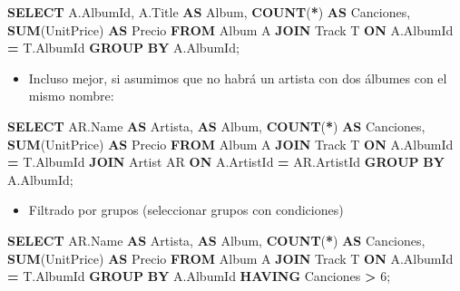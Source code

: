 \documentclass[
]{book}
\newenvironment{Shaded}{\begin{snugshade}}{\end{snugshade}}
\newcommand{\DecValTok}[1]{\textcolor[rgb]{0.00,0.00,0.81}{#1}}
\newcommand{\FunctionTok}[1]{\textcolor[rgb]{0.13,0.29,0.53}{\textbf{#1}}}
\newcommand{\KeywordTok}[1]{\textcolor[rgb]{0.13,0.29,0.53}{\textbf{#1}}}
\newcommand{\NormalTok}[1]{#1}
\newcommand{\OperatorTok}[1]{\textcolor[rgb]{0.81,0.36,0.00}{\textbf{#1}}}
\providecommand{\tightlist}{%
  \setlength{\itemsep}{0pt}\setlength{\parskip}{0pt}}
\theoremstyle{break}
\theoremstyle{nonumberplain}
\begin{document}
\begin{Shaded}
\begin{Highlighting}[]
  \KeywordTok{SELECT}\NormalTok{ A.AlbumId, A.Title }\KeywordTok{AS}\NormalTok{ Album, }\FunctionTok{COUNT}\NormalTok{(}\OperatorTok{*}\NormalTok{) }\KeywordTok{AS}\NormalTok{ Canciones, }\FunctionTok{SUM}\NormalTok{(UnitPrice) }\KeywordTok{AS}\NormalTok{ Precio }
  \KeywordTok{FROM}\NormalTok{ Album A }\KeywordTok{JOIN}\NormalTok{ Track T }\KeywordTok{ON}\NormalTok{ A.AlbumId }\OperatorTok{=}\NormalTok{ T.AlbumId }
  \KeywordTok{GROUP} \KeywordTok{BY}\NormalTok{ A.AlbumId;}
\end{Highlighting}
\end{Shaded}

\begin{itemize}
\tightlist
\item
  Incluso mejor, si asumimos que no habrá un artista con dos álbumes con el mismo nombre:
\end{itemize}

\begin{Shaded}
\begin{Highlighting}[]
  \KeywordTok{SELECT}\NormalTok{ AR.Name }\KeywordTok{AS}\NormalTok{ Artista, }\KeywordTok{AS}\NormalTok{ Album, }\FunctionTok{COUNT}\NormalTok{(}\OperatorTok{*}\NormalTok{) }\KeywordTok{AS}\NormalTok{ Canciones, }\FunctionTok{SUM}\NormalTok{(UnitPrice) }\KeywordTok{AS}\NormalTok{ Precio }
  \KeywordTok{FROM}\NormalTok{ Album A }\KeywordTok{JOIN}\NormalTok{ Track T }\KeywordTok{ON}\NormalTok{ A.AlbumId }\OperatorTok{=}\NormalTok{ T.AlbumId}
               \KeywordTok{JOIN}\NormalTok{ Artist AR }\KeywordTok{ON}\NormalTok{ A.ArtistId }\OperatorTok{=}\NormalTok{ AR.ArtistId }
  \KeywordTok{GROUP} \KeywordTok{BY}\NormalTok{ A.AlbumId;}
\end{Highlighting}
\end{Shaded}

\begin{itemize}
\tightlist
\item
  Filtrado por grupos (seleccionar grupos con condiciones)
\end{itemize}

\begin{Shaded}
\begin{Highlighting}[]
  \KeywordTok{SELECT}\NormalTok{ AR.Name }\KeywordTok{AS}\NormalTok{ Artista, }\KeywordTok{AS}\NormalTok{ Album, }\FunctionTok{COUNT}\NormalTok{(}\OperatorTok{*}\NormalTok{) }\KeywordTok{AS}\NormalTok{ Canciones, }\FunctionTok{SUM}\NormalTok{(UnitPrice) }\KeywordTok{AS}\NormalTok{ Precio}
  \KeywordTok{FROM}\NormalTok{ Album A }\KeywordTok{JOIN}\NormalTok{ Track T }\KeywordTok{ON}\NormalTok{ A.AlbumId }\OperatorTok{=}\NormalTok{ T.AlbumId }
  \KeywordTok{GROUP} \KeywordTok{BY}\NormalTok{ A.AlbumId}
  \KeywordTok{HAVING}\NormalTok{ Canciones }\OperatorTok{\textgreater{}} \DecValTok{6}\NormalTok{; }
\end{Highlighting}
\end{Shaded}
\end{document}
